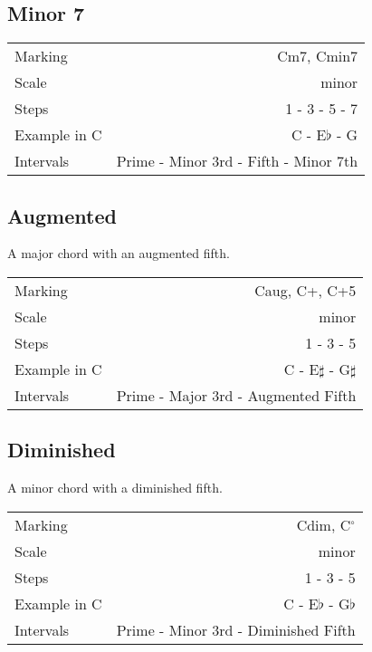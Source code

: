 \subsection{Minor 7}
\begin{tabular}{ l | r }
    Marking      & Cm7, Cmin7 \\
    Scale        & minor \\
    Steps        & 1 - 3 - 5 - 7 \\
    Example in C & C - E$\flat$ - G \\
    Intervals    & Prime - Minor 3rd - Fifth - Minor 7th \\
\end{tabular}

\subsection{Augmented}
A major chord with an augmented fifth.

\begin{tabular}{ l | r }
    Marking      & Caug, C+, C+5 \\
    Scale        & minor \\
    Steps        & 1 - 3 - 5 \\
    Example in C & C - E$\sharp$ - G$\sharp$ \\
    Intervals    & Prime - Major 3rd - Augmented Fifth \\
\end{tabular}

\subsection{Diminished}
A minor chord with a diminished fifth.

\begin{tabular}{ l | r }
    Marking      & Cdim, C$^{\circ}$ \\
    Scale        & minor \\
    Steps        & 1 - 3 - 5 \\
    Example in C & C - E$\flat$ - G$\flat$ \\
    Intervals    & Prime - Minor 3rd - Diminished Fifth \\
\end{tabular}
